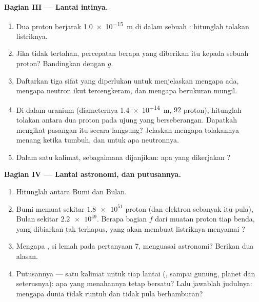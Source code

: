 \begin{problem}
\medskip
\noindent\textbf{Bagian III --- Lantai intinya.}
\begin{enumerate}[resume]
  \item Dua proton berjarak \qty{1.0e-15}{m} di dalam sebuah :
        hitunglah tolakan listriknya.
  \item Jika tidak tertahan, percepatan berapa yang diberikan  itu
        kepada sebuah proton? Bandingkan dengan $g$.
  \item Daftarkan tiga sifat yang diperlukan  untuk
        menjelaskan mengapa  ada, mengapa neutron ikut
        tercengkeram, dan mengapa  berukuran mungil.
  \item Di dalam  uranium (diameternya \qty{1.4e-14}{m}, $92$
        proton), hitunglah tolakan antara dua proton pada ujung yang
        berseberangan. Dapatkah  mengikat pasangan itu
        secara langsung? Jelaskan mengapa tolakannya menang ketika  tumbuh, dan untuk apa neutronnya.
  \item Dalam satu kalimat, sebagaimana dijanjikan: apa yang dikerjakan
        ?
\end{enumerate}

\medskip
\noindent\textbf{Bagian IV --- Lantai astronomi, dan putusannya.}
\begin{enumerate}[resume]
  \item Hitunglah  antara Bumi dan Bulan.
  \item Bumi memuat sekitar $\num{1.8e51}$ proton (dan elektron
        sebanyak itu pula), Bulan sekitar $\num{2.2e49}$. Berapa bagian
        $f$ dari muatan proton tiap benda, yang dibiarkan tak terhapus,
        yang akan membuat  listriknya menyamai ?
  \item Mengapa , si lemah pada pertanyaan 7, menguasai
        astronomi? Berikan dua alasan.
  \item Putusannya --- satu kalimat untuk tiap lantai (, 
        sampai gunung, planet dan seterusnya): apa yang menahannya tetap
        bersatu? Lalu jawablah judulnya: mengapa dunia tidak runtuh dan
        tidak pula berhamburan?
\end{enumerate}
\end{problem}
